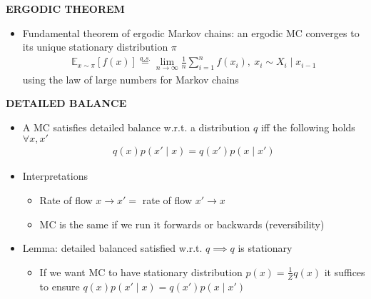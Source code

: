\begin{whitebox}{\textbf{ERGODIC THEOREM}}
    \begin{itemize}
        \item Fundamental theorem of ergodic Markov chains: an ergodic MC converges to its unique stationary distribution $\pi$
        \begin{align*}
            \mathbb{E}_{x\sim\pi}[f(x)]\overset{a.s.}{=}\lim_{n\to\infty}\frac{1}{n}\sum_{i=1}^nf(x_i),\ x_i\sim X_i\mid x_{i-1}
        \end{align*}
        using the law of large numbers for Markov chains
    \end{itemize}
\end{whitebox}

\begin{whitebox}{\textbf{DETAILED BALANCE}}
    \begin{itemize}
        \item A MC satisfies detailed balance w.r.t. a distribution $q$ iff the following holds $\forall x,x'$
        \begin{align*}
            q(x)p(x'\mid x)=q(x')p(x\mid x')
        \end{align*}
        \item Interpretations
        \begin{itemize}
            \item Rate of flow $x\to x'=$ rate of flow $x'\to x$
            \item MC is the same if we run it forwards or backwards (reversibility)
        \end{itemize}
        \item Lemma: detailed balanced satisfied w.r.t. $q\implies q$ is stationary
        \begin{itemize}
            \item If we want MC to have stationary distribution $p(x)=\frac{1}{Z}q(x)$ it suffices to ensure $q(x)p(x'\mid x)=q(x')p(x\mid x')$
        \end{itemize}
    \end{itemize}
\end{whitebox}

